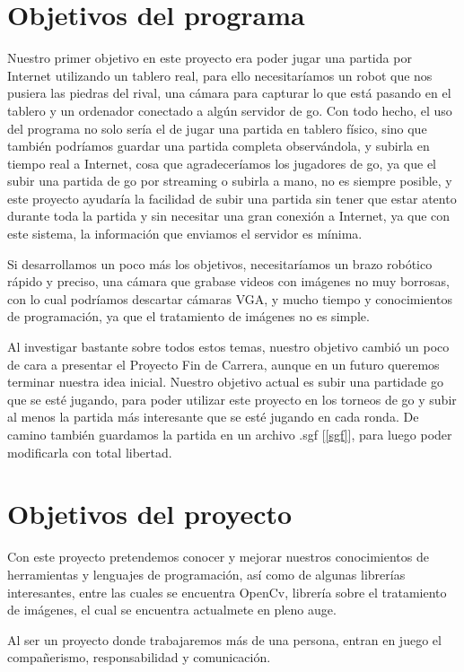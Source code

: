 \documentclass[12pt,a4paper]{report}
\begin{document}
\section{Objetivos del programa} 


Nuestro primer objetivo en este proyecto era poder jugar una partida por
Internet utilizando un tablero real, para ello necesitaríamos un robot que nos
pusiera las piedras del rival, una cámara para capturar lo que está pasando en
el tablero y un ordenador conectado a algún servidor de go. Con todo hecho, el
uso del programa no solo sería el de jugar una partida en tablero físico, sino
que también podríamos guardar una partida completa observándola, y subirla en
tiempo real a Internet, cosa que agradeceríamos los jugadores de go, ya que el
subir una partida de go por streaming o subirla a mano, no es siempre posible, y
este proyecto ayudaría la facilidad de subir una partida sin tener que estar
atento durante toda la partida y sin necesitar una gran conexión a Internet, ya
que con este sistema, la información que enviamos el servidor es mínima. 

Si desarrollamos un poco más los objetivos, necesitaríamos un brazo robótico
rápido y preciso, una cámara que grabase videos con imágenes no muy borrosas,
con lo cual podríamos descartar cámaras VGA, y mucho tiempo y conocimientos de
programación, ya que el tratamiento de imágenes no es simple. 

Al investigar bastante sobre todos estos temas, nuestro objetivo cambió un poco
de cara a presentar el Proyecto Fin de Carrera, aunque en un futuro queremos
terminar nuestra idea inicial. Nuestro objetivo actual es subir una partidade go
que se esté jugando, para poder utilizar este proyecto en los torneos de go y
subir al menos la partida más interesante que se esté jugando en cada ronda. De
camino también guardamos la partida en un archivo .sgf [\ref{sgf}], para luego
poder modificarla con total libertad. 


\section{Objetivos del proyecto} 

Con este proyecto pretendemos conocer y mejorar nuestros conocimientos de 
herramientas y lenguajes de programación, así como de algunas librerías
interesantes, entre las cuales se encuentra OpenCv, librería sobre el
tratamiento de imágenes, el cual se encuentra actualmete en pleno auge. 

Al ser un proyecto donde trabajaremos más de una persona, entran en juego el
compañerismo, responsabilidad y comunicación. 
\end{document}
